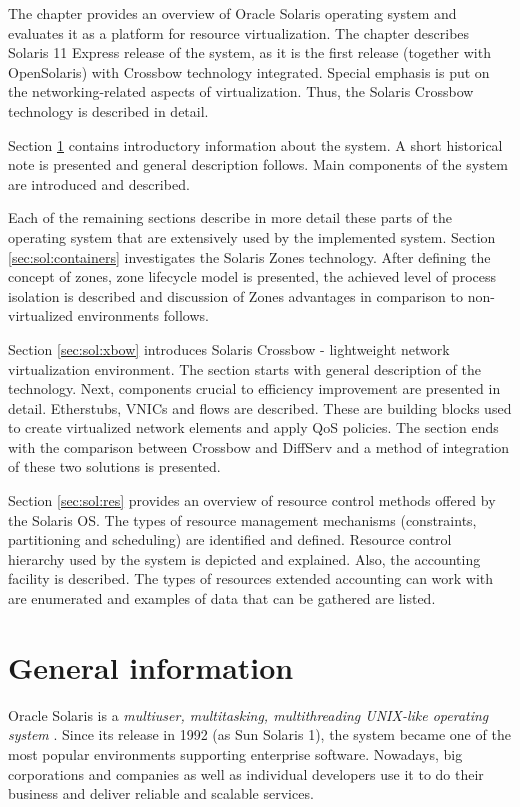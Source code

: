 \documentclass[11pt]{book}
\begin{document}
    The chapter provides an overview of Oracle Solaris operating system and evaluates it as a platform for resource
    virtualization. The chapter describes Solaris 11 Express release of the system, as it is the first release
    (together with OpenSolaris) with Crossbow technology integrated. Special emphasis is put on the networking-related
    aspects of virtualization. Thus, the Solaris Crossbow technology is described in detail.

    Section \ref{sec:sol:general} contains introductory information about the system. A short historical note is
    presented and general description follows. Main components of the system are introduced and described.
    
    Each of the remaining sections describe in more detail these parts of the operating system that are extensively
    used by the implemented system. Section \ref{sec:sol:containers} investigates the Solaris Zones technology. After
    defining the concept of zones, zone lifecycle model is presented, the achieved level of process isolation is
    described and discussion of Zones advantages in comparison to non-virtualized environments follows.

    Section \ref{sec:sol:xbow} introduces Solaris Crossbow - lightweight network virtualization environment. The
    section starts with general description of the technology. Next, components crucial to efficiency improvement are
    presented in detail. Etherstubs, VNICs and flows are described. These are building blocks used to create
    virtualized network elements and apply QoS policies. The section ends with the comparison between Crossbow and
    DiffServ and a method of integration of these two solutions is presented.

    Section \ref{sec:sol:res} provides an overview of resource control methods offered by the Solaris OS. The types
    of resource management mechanisms (constraints, partitioning and scheduling) are identified and defined. Resource
    control hierarchy used by the system is depicted and explained. Also, the accounting facility is described. The
    types of resources extended accounting can work with are enumerated and examples of data that can be gathered are
    listed.


    \section{General information}
    \label{sec:sol:general}

      Oracle Solaris is a \textit{multiuser, multitasking, multithreading UNIX-like operating system} \cite{reference}.
      Since its release in 1992 (as Sun Solaris 1), the system became one of the most popular environments supporting
      enterprise software. Nowadays, big corporations and companies as well as individual developers use it to do their
      business and deliver reliable and scalable services.
\end{document}
